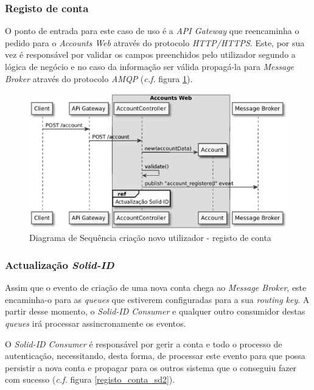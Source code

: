 \subsubsection{Registo de conta}

O ponto de entrada para este caso de uso é a \emph{API Gateway} que reencaminha o pedido para o \emph{Accounts Web} através do protocolo \emph{HTTP/HTTPS}. Este, por sua vez é responsável por validar os campos preenchidos pelo utilizador segundo a lógica de negócio e no caso da informação ser válida propagá-la para \emph{Message Broker} através do protocolo \emph{AMQP} (\emph{c.f.} figura \ref{registo_conta_sd1}).

\begin{figure}[H]
    \begin{center}
    \includegraphics[width=0.8 \textwidth]{figures/create_account_sd_diagram_1.eps}
    \caption{Diagrama de Sequência criação novo utilizador - registo de conta}
    \label{registo_conta_sd1}
    \end{center}
\end{figure}

\subsubsection{Actualização \emph{Solid-ID}}

Assim que o evento de criação de uma nova conta chega ao \emph{Message Broker}, este encaminha-o para as \emph{queues} que estiverem configuradas para a sua \emph{routing key}. A partir desse momento, o \emph{Solid-ID Consumer} e qualquer outro consumidor  destas \emph{queues} irá processar assincronamente os eventos.

O \emph{Solid-ID Consumer} é responsável por gerir a conta e todo o processo de autenticação, necessitando, desta forma, de processar este evento para que possa persistir a nova conta e propagar para os outros sistema que o conseguiu fazer com sucesso (\emph{c.f.} figura \ref{registo_conta_sd2}).

